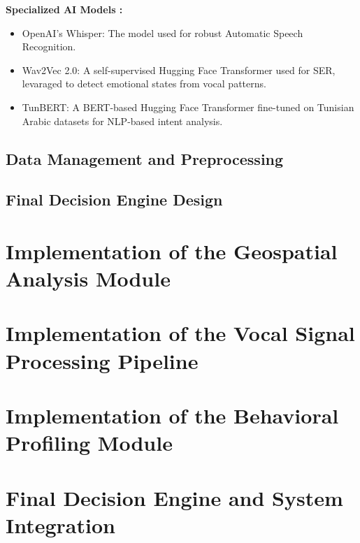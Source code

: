 \documentclass[12pt,a4paper,oneside,english]{book}
\begin{document}
{\textbf{Specialized AI Models :}
\begin{itemize}
\item OpenAI's Whisper: The model used for robust Automatic Speech Recognition.
\item Wav2Vec 2.0: A self-supervised Hugging Face Transformer used for SER, levaraged to detect emotional states from vocal patterns.
\item TunBERT: A BERT-based Hugging Face Transformer fine-tuned on Tunisian Arabic datasets for NLP-based intent analysis.%

\end{itemize}

\subsection{Data Management and Preprocessing}
\subsection{Final Decision Engine Design }

\section{Implementation of the Geospatial Analysis Module}
\section{Implementation of the Vocal Signal Processing Pipeline}
\section{Implementation of the Behavioral Profiling Module} %
\section{Final Decision Engine and System Integration}

}
\end{document}

